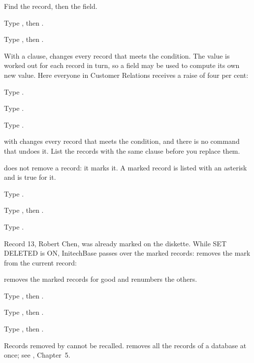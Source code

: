 Find the record, then  the field.
\begin{Steps}[resume]
\item Type , then .
\item Type , then .
\end{Steps}

With a  clause,  changes every record that meets the
condition.  The value is worked out for each record in turn, so a field may be
used to compute its own new value.  Here everyone in Customer Relations
receives a raise of four per cent:
\begin{Steps}[resume]
\item Type .
\item Type .
\item Type .
\end{Steps}
\begin{AteWarning}
 with  changes every record that meets the condition, and
there is no command that undoes it.  List the records with the same 
clause before you replace them.
\end{AteWarning}

 does not remove a record: it marks it.  A marked record is listed
with an asterisk and  is true for it.
\begin{Steps}[resume]
\item Type .
\item Type , then .
\item Type .
\end{Steps}
Record 13, Robert Chen, was already marked on the diskette.  While SET DELETED
is ON, InitechBase passes over the marked records:
 removes the mark from the current record:

 removes the marked records for good and renumbers the others.
\begin{Steps}[resume]
\item Type , then .
\item Type , then .
\item Type , then .
\end{Steps}
\begin{AteWarning}
Records removed by  cannot be recalled.   removes all the
records of a database at once; see , Chapter~5.
\end{AteWarning}

